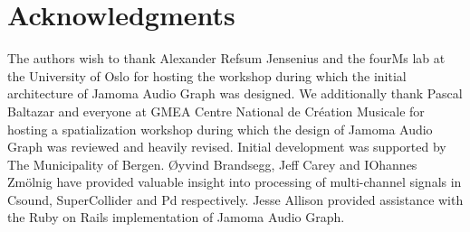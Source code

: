 \documentclass[twoside,a4paper]{article}
\begin{document}
%
\section{Acknowledgments} %
%

The authors wish to thank Alexander Refsum Jensenius and the fourMs lab at the University of Oslo for hosting the workshop during which the initial architecture of Jamoma Audio Graph was designed. %
We additionally thank Pascal Baltazar and everyone at GMEA Centre National de Cr\' eation Musicale for hosting a spatialization workshop during which the design of Jamoma Audio Graph was reviewed and heavily revised. %
Initial development was supported by The Municipality of Bergen.  
\O yvind Brandsegg, Jeff Carey and IOhannes Zm\"olnig have provided valuable insight into processing of multi-channel signals in Csound, SuperCollider and Pd respectively.
Jesse Allison provided assistance with the Ruby on Rails implementation of Jamoma Audio Graph.





\end{document}
